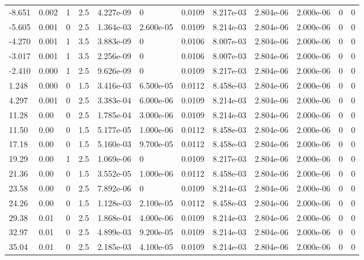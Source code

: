 \documentclass[preview]{standalone}
\begin{document}
{{\begin{tabular}{L{1.2cm}C{1.2cm} C{0.3cm}C{0.5cm} C{1.4cm}C{1.4cm} C{1.4cm}C{1.4cm} C{1.6cm}C{1.6cm} C{1.6cm}C{1.6cm}}
  -8.651  &  0.002  & 1     & 2.5 &  4.227e-09  & 0  &  0.0109&   8.217e-03& 2.804e-06 & 2.000e-06   &  0 & 0  \\ 
  -5.605  &  0.001  & 0     & 2.5 &  1.364e-03  & 2.600e-05  &  0.0109&   8.214e-03& 2.804e-06 & 2.000e-06   &  0 & 0  \\ 
  -4.270  &  0.001  & 1     & 3.5 &  3.883e-09  & 0  &  0.0106&   8.007e-03& 2.804e-06 & 2.000e-06   &  0 & 0  \\ 
  -3.017  &  0.001  & 1     & 3.5 &  2.256e-09  & 0  &  0.0106&   8.007e-03& 2.804e-06 & 2.000e-06   &  0 & 0  \\ 
  -2.410  &  0.000  & 1     & 2.5 &  9.626e-09  & 0  &  0.0109&   8.217e-03& 2.804e-06 & 2.000e-06   &  0 & 0  \\ 
  1.248  &  0.000  & 0     & 1.5 &  3.416e-03  & 6.500e-05  &  0.0112&   8.458e-03& 2.804e-06 & 2.000e-06   &  0 & 0  \\ 
  4.297  &  0.001  & 0     & 2.5 &  3.383e-04  & 6.000e-06  &  0.0109&   8.214e-03& 2.804e-06 & 2.000e-06   &  0 & 0  \\ 
  11.28  &  0.00  & 0     & 2.5 &  1.785e-04  & 3.000e-06  &  0.0109&   8.214e-03& 2.804e-06 & 2.000e-06   &  0 & 0  \\ 
  11.50  &  0.00  & 0     & 1.5 &  5.177e-05  & 1.000e-06  &  0.0112&   8.458e-03& 2.804e-06 & 2.000e-06   &  0 & 0  \\ 
  17.18  &  0.00  & 0     & 1.5 &  5.160e-03  & 9.700e-05  &  0.0112&   8.458e-03& 2.804e-06 & 2.000e-06   &  0 & 0  \\ 
  19.29  &  0.00  & 1     & 2.5 &  1.069e-06  & 0  &  0.0109&   8.217e-03& 2.804e-06 & 2.000e-06   &  0 & 0  \\ 
  21.36  &  0.00  & 0     & 1.5 &  3.552e-05  & 1.000e-06  &  0.0112&   8.458e-03& 2.804e-06 & 2.000e-06   &  0 & 0  \\ 
  23.58  &  0.00  & 0     & 2.5 &  7.892e-06  & 0  &  0.0109&   8.214e-03& 2.804e-06 & 2.000e-06   &  0 & 0  \\ 
  24.26  &  0.00  & 0     & 1.5 &  1.128e-03  & 2.100e-05  &  0.0112&   8.458e-03& 2.804e-06 & 2.000e-06   &  0 & 0  \\ 
  29.38  &  0.01  & 0     & 2.5 &  1.868e-04  & 4.000e-06  &  0.0109&   8.214e-03& 2.804e-06 & 2.000e-06   &  0 & 0  \\ 
  32.97  &  0.01  & 0     & 2.5 &  4.899e-03  & 9.200e-05  &  0.0109&   8.214e-03& 2.804e-06 & 2.000e-06   &  0 & 0  \\ 
  35.04  &  0.01  & 0     & 2.5 &  2.185e-03  & 4.100e-05  &  0.0109&   8.214e-03& 2.804e-06 & 2.000e-06   &  0 & 0  \\ 

\end{tabular}}}
\end{document}
